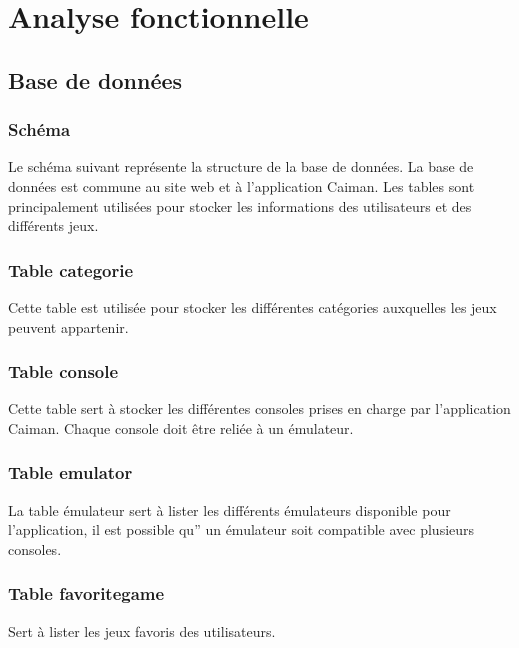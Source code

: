 \documentclass[a4paper,12pt,french]{sphinxmanual}
\begin{document}
\chapter{Analyse fonctionnelle}
\label{\detokenize{fonctionnelle:analyse-fonctionnelle}}\label{\detokenize{fonctionnelle::doc}}

\section{Base de données}
\label{\detokenize{fonctionnelle:base-de-donnees}}

\subsection{Schéma}
\label{\detokenize{fonctionnelle:schema}}
\sphinxAtStartPar
Le schéma suivant représente la structure de la base de données. La base de données est commune au site web et à l’application Caiman. Les tables sont principalement utilisées pour stocker les informations des utilisateurs et des différents jeux.

\sphinxAtStartPar
{}


\subsection{Table categorie}
\label{\detokenize{fonctionnelle:table-categorie}}
\sphinxAtStartPar
Cette table est utilisée pour stocker les différentes catégories auxquelles les jeux peuvent appartenir.


\subsection{Table console}
\label{\detokenize{fonctionnelle:table-console}}
\sphinxAtStartPar
Cette table sert à stocker les différentes consoles prises en charge par l’application Caiman. Chaque console doit être reliée à un émulateur.


\subsection{Table emulator}
\label{\detokenize{fonctionnelle:table-emulator}}
\sphinxAtStartPar
La table émulateur sert à lister les différents émulateurs disponible pour l’application, il est possible qu” un émulateur soit compatible avec plusieurs consoles.


\subsection{Table favoritegame}
\label{\detokenize{fonctionnelle:table-favoritegame}}
\sphinxAtStartPar
Sert à lister les jeux favoris des utilisateurs.
\end{document}
